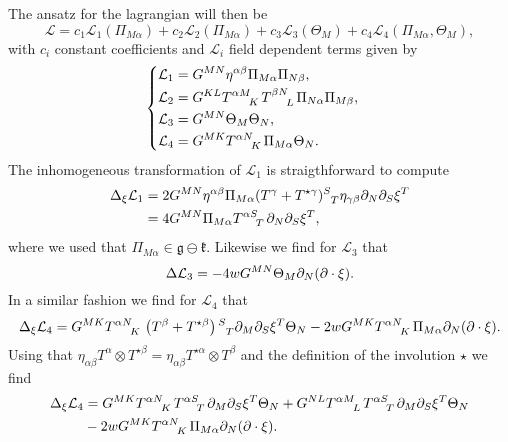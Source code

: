 The ansatz for the lagrangian will then be
\begin{equation}
    \mathcal{L} = c_1\mathcal{L}_1(\Pi_{M\alpha})+c_2\mathcal{L}_2(\Pi_{M\alpha})+c_3\mathcal{L}_3(\Theta_M)+c_4\mathcal{L}_4(\Pi_{M\alpha},\Theta_M),
\end{equation}
with $c_i$ constant coefficients and $\mathcal{L}_i$ field dependent terms given by 
\begin{equation}
    \begin{cases}\begin{aligned}
        \mathcal{L}_1 &= G^{MN}\eta^{\alpha\beta}\Pi_{M\alpha}\Pi_{N\beta},\\
        \mathcal{L}_2 &= G^{KL}\tensor{T}{^{\alpha M}_K}\tensor{T}{^{\beta N}_L}\Pi_{N\alpha}\Pi_{M\beta},\\
        \mathcal{L}_3 &= G^{MN}\Theta_M\Theta_N,\\
        \mathcal{L}_4 &= G^{MK}\tensor{T}{^{\alpha N}_K}\Pi_{M\alpha}\Theta_{N}.
    \end{aligned}
    \end{cases}
\end{equation}
The inhomogeneous transformation of $\mathcal{L}_1$ is straigthforward to compute
\begin{equation}
    \begin{aligned}
        \Delta_\xi \mathcal{L}_1 &= 2G^{MN}\eta^{\alpha\beta}\Pi_{M\alpha}(T^{\gamma}+T^{\star\gamma})\tensor{}{^S_T}\eta_{\gamma\beta}\pd_N\pd_S\xi^T\\
        &= 4G^{MN}\Pi_{M\alpha}\tensor{T}{^{\alpha S}_T}\pd_N\pd_S\xi^T,
    \end{aligned}
\end{equation}
where we used that $\Pi_{M\alpha}\in\mathfrak{g}\ominus\mathfrak{k}$. Likewise we find for $\mathcal{L}_3$ that 
\begin{equation}
    \Delta \mathcal{L}_3 = -4wG^{MN}\Theta_M\partial_N(\partial\cdot \xi).
\end{equation}
In a similar fashion we find for $\mathcal{L}_4$ that 
\begin{equation}
        \Delta_\xi \mathcal{L}_4 = G^{MK}\tensor{T}{^{\alpha N}_K}\left(T^\beta+T^{\star\beta}\right)\tensor{}{^S_T}\pd_M\pd_S\xi^T\Theta_N-2wG^{MK}\tensor{T}{^{\alpha N}_K}\Pi_{M\alpha}\pd_N(\pd\cdot \xi).
\end{equation}
Using that $\eta_{\alpha\beta}T^\alpha\otimes T^{\star\beta} = \eta_{\alpha\beta}T^{\star\alpha}\otimes T^{\beta}$ and the definition of the involution $\star$ we find 
\begin{equation}
    \begin{aligned}
    \Delta_\xi \mathcal{L}_4 &= G^{MK}\tensor{T}{^{\alpha N}_K}\tensor{T}{^{\alpha S}_T}\pd_M\pd_S\xi^T\Theta_N+G^{NL}\tensor{T}{^{\alpha M}_L}\tensor{T}{^{\alpha S}_T}\pd_M\pd_S\xi^T\Theta_N\\
    &-2wG^{MK}\tensor{T}{^{\alpha N}_K}\Pi_{M\alpha}\pd_N(\pd\cdot\xi).
    \end{aligned}
\end{equation}
